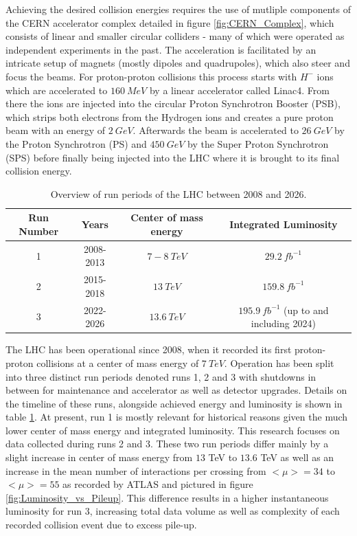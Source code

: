 Achieving the desired collision energies requires the use of mutliple components of the CERN accelerator complex 
detailed in figure \ref{fig:CERN_Complex}, which consists of linear and smaller circular colliders - many of which were 
operated as independent experiments in the past. The acceleration is facilitated by an intricate setup of magnets (mostly 
dipoles and quadrupoles), which also steer and focus the beams. For proton-proton collisions this process starts with $H^-$ 
ions which are accelerated to $160\ MeV$ by a linear accelerator called Linac4. From there the ions are injected into the 
circular Proton Synchrotron Booster (PSB), which strips both electrons from the Hydrogen ions and creates a pure proton beam 
with an energy of $2\ GeV$. Afterwards the beam is accelerated to $26\ GeV$ by the Proton Synchrotron (PS) and $450\ GeV$ by 
the Super Proton Synchrotron (SPS) before finally being injected into the LHC where it is brought to its final collision 
energy. \par

\begin{table}
\begin{center}
\caption{Overview of run periods of the LHC between 2008 and 2026.}
\label{table-lhc-runs}
\begin{tabular}{|c c c c|} 
 \hline
 Run Number & Years & Center of mass energy & Integrated Luminosity \\ [0.5ex] 
 \hline
 1 & 2008-2013 & $7-8\ TeV$ & $29.2\ fb^{-1}$ \\ 
 2 & 2015-2018 & $13\ TeV$ & $159.8\ fb^{-1}$ \\ 
 3 & 2022-2026 & $13.6\ TeV$ & $195.9\ fb^{-1}$ (up to and including 2024) \\ 
 \hline
\end{tabular}
\end{center}
\end{table}

The LHC has been operational since 2008, when it recorded its first proton-proton collisions at a center of mass energy 
of $7\ TeV$. Operation has been split into three distinct run periods denoted runs 1, 2 and 3 with shutdowns in between for 
maintenance and accelerator as well as detector upgrades. Details on the timeline of these runs, alongside achieved energy 
and luminosity is shown in table \ref{table-lhc-runs}. At present, run 1 is mostly relevant for historical reasons given the 
much lower center of mass energy and integrated luminosity. This research focuses on data collected during runs 2 and 3. These 
two run periods differ mainly by a slight increase in center of mass energy from $13$ TeV to $13.6$ TeV as well as an increase 
in the mean number of interactions per crossing from $<\mu> = 34$ to $<\mu> = 55$ as recorded by ATLAS and pictured in figure 
\ref{fig:Luminosity_vs_Pileup}. This difference results in a higher instantaneous luminosity for run 3, increasing total data 
volume as well as complexity of each recorded collision event due to excess pile-up.

